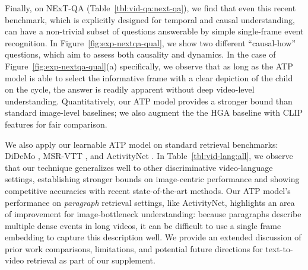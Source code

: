 Finally, on NExT-QA (Table~\ref{tbl:vid-qa:next-qa}), we find that even this recent benchmark, which is explicitly designed for temporal and causal understanding, can have a non-trivial subset of questions answerable by simple single-frame event recognition. In Figure~\ref{fig:exp-nextqa-qual}, we show two different ``causal-how'' questions, which aim to assess both causality and dynamics. In the case of  Figure~\ref{fig:exp-nextqa-qual}(a) specifically, we observe that as long as the ATP model is able to select the informative frame with a clear depiction of the child on the cycle, the answer is readily apparent without deep video-level understanding. Quantitatively, our ATP model provides a stronger bound than standard image-level baselines; we also augment the the HGA baseline with CLIP features for fair comparison.






 We also apply our learnable ATP model on standard retrieval benchmarks: DiDeMo \cite{hendricks2018localizing}, MSR-VTT \cite{xu2016msr}, and ActivityNet \cite{krishna2017dense}. In Table~\ref{tbl:vid-lang:all}, we observe that our technique generalizes well to other discriminative video-language settings, establishing stronger bounds on image-centric performance and showing competitive accuracies with recent state-of-the-art methods. Our ATP model's performance on \textit{paragraph} retrieval settings, like ActivityNet, highlights an area of improvement for image-bottleneck understanding: because paragraphs describe multiple dense events in long videos, it can be difficult to use a single frame embedding to capture this description well. We provide an extended discussion of prior work comparisons, limitations, and potential future directions for text-to-video retrieval as part of our supplement.



